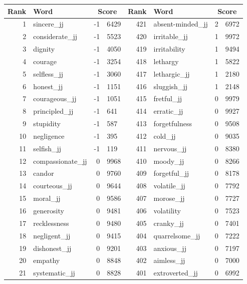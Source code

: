 \begin{table}[tbp]
    \begin{tabular}{| rlr@{.}l | rlr@{.}l |}
    \hline
    \textbf{Rank} & \textbf{Word} & \multicolumn{2}{c|}{\textbf{Score}} & \textbf{Rank} & \textbf{Word} & \multicolumn{2}{c|}{\textbf{Score}} \\
    \hline
    1 & sincere\_jj & -1 & 6429    &    421 & absent-minded\_jj & 2 & 6972 \\
    2 & considerate\_jj & -1 & 5523    &    420 & irritable\_jj & 1 & 9972 \\
    3 & dignity & -1 & 4050    &    419 & irritability & 1 & 9494 \\
    4 & courage & -1 & 3254    &    418 & lethargy & 1 & 5822 \\
    5 & selfless\_jj & -1 & 3060    &    417 & lethargic\_jj & 1 & 2180 \\
    6 & honest\_jj & -1 & 1151    &    416 & sluggish\_jj & 1 & 2148 \\
    7 & courageous\_jj & -1 & 1051    &    415 & fretful\_jj & 0 & 9979 \\
    8 & principled\_jj & -1 & 641    &    414 & erratic\_jj & 0 & 9927 \\
    9 & stupidity & -1 & 587    &    413 & forgetfulness & 0 & 9508 \\
    10 & negligence & -1 & 395    &    412 & cold\_jj & 0 & 9035 \\
    11 & selfish\_jj & -1 & 119    &    411 & nervous\_jj & 0 & 8380 \\
    12 & compassionate\_jj & 0 & 9968    &    410 & moody\_jj & 0 & 8266 \\
    13 & candor & 0 & 9760    &    409 & forgetful\_jj & 0 & 8178 \\
    14 & courteous\_jj & 0 & 9644    &    408 & volatile\_jj & 0 & 7792 \\
    15 & moral\_jj & 0 & 9586    &    407 & morose\_jj & 0 & 7727 \\
    16 & generosity & 0 & 9481    &    406 & volatility & 0 & 7523 \\
    17 & recklessness & 0 & 9480    &    405 & cranky\_jj & 0 & 7401 \\
    18 & negligent\_jj & 0 & 9415    &    404 & quarrelsome\_jj & 0 & 7222 \\
    19 & dishonest\_jj & 0 & 9201    &    403 & anxious\_jj & 0 & 7197 \\
    20 & empathy & 0 & 8848    &    402 & aimless\_jj & 0 & 7000 \\
    21 & systematic\_jj & 0 & 8828    &    401 & extroverted\_jj & 0 & 6992 \\

\end{tabular}
\end{table}
